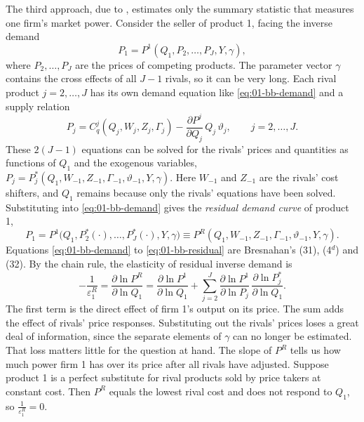 The third approach, due to \citet{BakerBresnahan1985,BakerBresnahan1988}, estimates only the summary statistic that
measures one firm's market power. Consider the seller of product 1, facing the inverse demand
\begin{equation}\label{eq:01-bb-demand}
P_1 = P^1(Q_1, P_2, \dots, P_J, Y, \gamma),
\end{equation}
where $P_2, \dots, P_J$ are the prices of competing products. The parameter vector $\gamma$ contains the cross effects of
all $J - 1$ rivals, so it can be very long. Each rival product $j = 2, \dots, J$ has its own demand equation like
\eqref{eq:01-bb-demand} and a supply relation
\begin{equation}\label{eq:01-bb-rival}
P_j = C_q^{j}(Q_j, W_j, Z_j, \Gamma_j) - \frac{\partial P^{j}}{\partial Q_j}\, Q_j\, \vartheta_j ,
\qquad j = 2, \dots, J .
\end{equation}
These $2(J - 1)$ equations can be solved for the rivals' prices and quantities as functions of $Q_1$ and the exogenous
variables, $P_j = P_j^*(Q_1, W_{-1}, Z_{-1}, \Gamma_{-1}, \vartheta_{-1}, Y, \gamma)$. Here $W_{-1}$ and $Z_{-1}$ are the
rivals' cost shifters, and $Q_1$ remains because only the rivals' equations have been solved. Substituting into
\eqref{eq:01-bb-demand} gives the \emph{residual demand curve} of product 1,
\begin{equation}\label{eq:01-bb-residual}
P_1 = P^1\bigl(Q_1, P_2^*(\cdot), \dots, P_J^*(\cdot), Y, \gamma\bigr)
    \equiv P^{R}(Q_1, W_{-1}, Z_{-1}, \Gamma_{-1}, \vartheta_{-1}, Y, \gamma).
\end{equation}
Equations \eqref{eq:01-bb-demand} to \eqref{eq:01-bb-residual} are Bresnahan's (31), (4$^d$) and (32). By the chain rule,
the elasticity of residual inverse demand is
\begin{equation*}
-\frac{1}{\varepsilon^{R}_1} = \frac{\partial \ln P^{R}}{\partial \ln Q_1}
 = \frac{\partial \ln P^1}{\partial \ln Q_1} + \sum_{j = 2}^{J}\frac{\partial \ln P^1}{\partial \ln P_j}\,
   \frac{\partial \ln P_j^*}{\partial \ln Q_1} .
\end{equation*}
The first term is the direct effect of firm 1's output on its price. The sum adds the effect of rivals' price responses.
Substituting out the rivals' prices loses a great deal of information, since the separate elements of $\gamma$ can no
longer be estimated. That loss matters little for the question at hand. The slope of $P^{R}$ tells us how much power
firm 1 has over its price after all rivals have adjusted. Suppose product 1 is a perfect substitute for rival products
sold by price takers at constant cost. Then $P^{R}$ equals the lowest rival cost and does not respond to $Q_1$, so
$\frac{1}{\varepsilon^{R}_1} = 0$.

